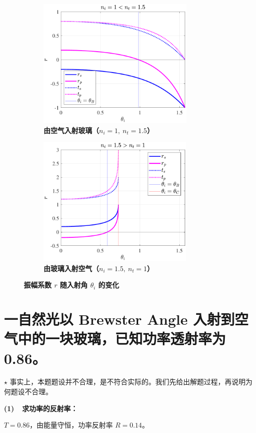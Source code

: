 \documentclass[UTF8]{report}
\theoremstyle{MyLineTheoremStyle} %
\theoremstyle{MyBlockTheoremStyle} %
\theoremstyle{MySubsubsectionStyle} %
\begin{document}
\begin{figure}[H]\centering
\begin{subfigure}[t]{0.49\textwidth}\centering
    \includegraphics[height=180pt]{assets/2/2024-09-15_10-53-31.pdf}
    \caption{\bfseries 由空气入射玻璃（$n_i = 1,\ n_t = 1.5$） }
\end{subfigure}
\begin{subfigure}[t]{0.49\textwidth}\centering
    \includegraphics[height=180pt]{assets/2/2024-09-15_10-53-27.pdf}
    \caption{\bfseries 由玻璃入射空气（$n_i = 1.5,\ n_t = 1$） }
\end{subfigure}
\caption{\bfseries 振幅系数 $r$ 随入射角 $\theta_i$ 的变化 }\label{振幅系数随入射角的变化}
\end{figure}


\section{一自然光以 Brewster Angle 入射到空气中的一块玻璃，已知功率透射率为 0.86。}

{\color{red} $\star $ 事实上，本题题设并不合理，是不符合实际的。我们先给出解题过程，再说明为何题设不合理。}

\textbf{(1)\ \ 求功率的反射率：}

$T = 0.86$，由能量守恒，功率反射率 $R = 0.14$。
\end{document}
